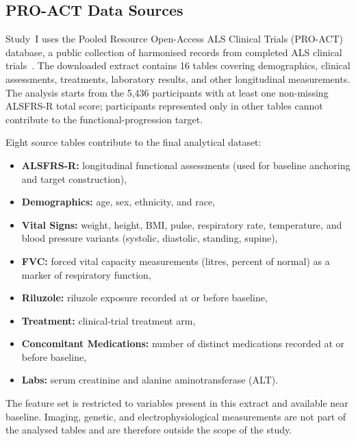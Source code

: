 \subsection{PRO-ACT Data Sources}
\label{sec:methods_proact_sources}
Study~I uses the Pooled Resource Open-Access \gls{ALS} Clinical Trials (\gls{PRO-ACT}) database, a public collection of harmonised records from completed ALS clinical trials~\cite{PROACT}. The downloaded extract contains 16 tables covering demographics, clinical assessments, treatments, laboratory results, and other longitudinal measurements. The analysis starts from the 5,436 participants with at least one non-missing \gls{ALSFRS-R} total score; participants represented only in other tables cannot contribute to the functional-progression target.

Eight source tables contribute to the final analytical dataset:
\begin{itemize}
  \item \textbf{\gls{ALSFRS-R}:} longitudinal functional assessments (used for baseline anchoring and target construction),
  \item \textbf{Demographics:} age, sex, ethnicity, and race,
  \item \textbf{Vital Signs:} weight, height, \gls{BMI}, pulse, respiratory rate, temperature, and blood pressure variants (systolic, diastolic, standing, supine),
  \item \textbf{\gls{FVC}:} forced vital capacity measurements (litres, percent of normal) as a marker of respiratory function,
  \item \textbf{Riluzole:} riluzole exposure recorded at or before baseline,
  \item \textbf{Treatment:} clinical-trial treatment arm,
  \item \textbf{Concomitant Medications:} number of distinct medications recorded at or before baseline,
  \item \textbf{Labs:} serum creatinine and alanine aminotransferase (\gls{ALT}).
\end{itemize}
The feature set is restricted to variables present in this extract and available near baseline. Imaging, genetic, and electrophysiological measurements are not part of the analysed tables and are therefore outside the scope of the study.

